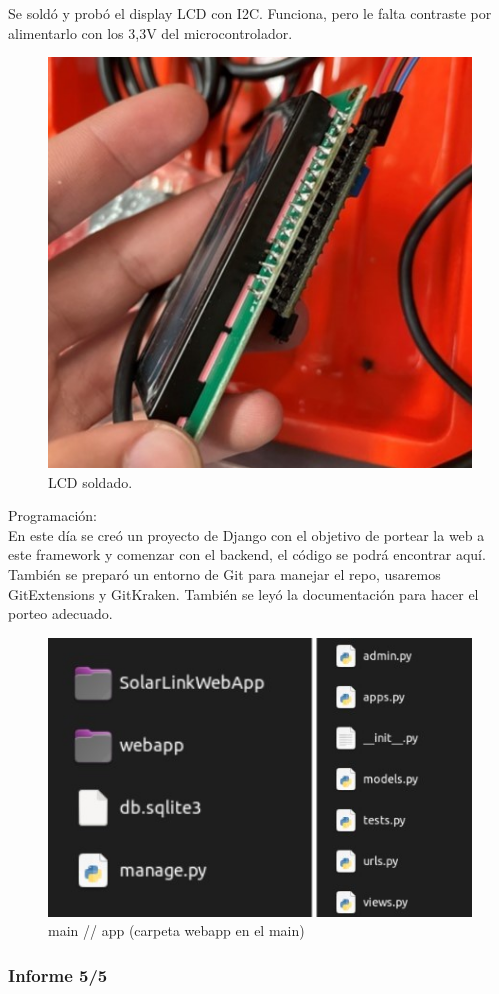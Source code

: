 Se soldó y probó el display LCD con I2C. Funciona, pero le falta contraste por alimentarlo con los 3,3V del microcontrolador.\\

\begin{figure}[H]
    \centering
    \includegraphics[width=0.55\linewidth]{informes/IMG_8019.jpg}
    \caption{LCD soldado.}
\end{figure}

Programación:\\

En este día se creó un proyecto de Django con el objetivo de portear la web a este framework y comenzar con el backend, el código se podrá encontrar aquí. También se preparó un entorno de Git para manejar el repo, usaremos GitExtensions y GitKraken. También se leyó la documentación para hacer el porteo adecuado.\\

\begin{figure}[H]
    \centering
    \includegraphics[width=0.5\linewidth]{informes/Screenshot_26.jpg}
    \caption{main // app (carpeta webapp en el main)}

\end{figure}

\subsubsection{Informe 5/5}

